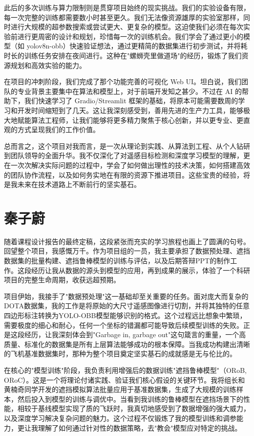 \documentclass[12pt, a4paper]{report}
\begin{document}
此后的多次训练与算力限制则是贯穿项目始终的现实挑战。我们的实验设备有限，每一次完整的训练都需要数小时甚至更久。我们无法像资源雄厚的实验室那样，同时进行大规模的超参数搜索或尝试更大、更复杂的模型。这迫使我们必须在每次实验前进行更周密的设计和规划，珍惜每一次的训练机会。我们学会了通过更小的模型（如 yolov8n-obb）快速验证想法，通过更精简的数据集进行初步测试，并将耗时长的训练任务安排在夜间进行。这种在"螺蛳壳里做道场"的经历，锻炼了我们资源规划和高效实验的能力。

在项目的冲刺阶段，我们完成了那个功能完善的可视化 Web UI。坦白说，我们团队的专业背景主要集中在算法和模型上，对于前端开发知之甚少。不过在 AI 的帮助下，我们快速学习了 Gradio/Streamlit 框架的基础，将原本可能需要数周的学习和开发时间缩短到了几天。这让我深刻感受到，善用先进的生产力工具，能够极大地赋能算法工程师，让我们能够将更多精力聚焦于核心创新，并以更专业、更直观的方式呈现我们的工作价值。

总而言之，这个项目对我而言，是一次从理论到实践、从算法到工程、从个人钻研到团队领导的全面升华。我不仅深化了对遥感目标检测和深度学习模型的理解，更在一次次解决实际问题的过程中，学会了如何做出理性的技术决策，如何搭建高效的团队协作流程，以及如何务实地在有限的资源下推进项目。这些宝贵的经验，将是我未来在技术道路上不断前行的坚实基石。

\vfill

\section{秦子蔚}
随着课程设计报告的最终定稿，这段紧张而充实的学习旅程也画上了圆满的句号。回望整个项目，我感慨万千。作为项目组的一员，我主要承担了数据预处理、遮挡数据集的批量构建、遮挡鲁棒模型的训练与评估，以及后期答辩PPT的制作工作。这段经历让我从数据的源头到模型的应用，再到成果的展示，体验了一个科研项目的完整生命周期，收获远超预期。

项目伊始，我接手了"数据预处理"这一基础却至关重要的任务。面对庞大而复杂的DOTA数据集，我的工作是将原始的大尺寸遥感图像进行切割，并将其独特的任意四边形标注转换为YOLO-OBB模型能够识别的格式。这个过程远比想象中繁琐，需要极度的细心和耐心，任何一个坐标的错漏都可能导致后续模型训练的失败。正是这段经历，让我深刻体会到"Garbage in, garbage out"这句箴言的重量，一个高质量、标准化的数据集是所有上层算法能够成功的根本保障。当我成功构建出清晰的飞机基准数据集时，那种为整个项目奠定坚实基石的成就感是无与伦比的。

在核心的"模型训练"阶段，我负责利用增强后的数据训练"遮挡鲁棒模型"（ORoB, ORoC）。这是一个将理论付诸实践、验证我们核心假设的关键环节。我将组长和黄楠奇同学开发的遮挡模拟算法批量应用于基准数据集，生成了大规模的训练样本，然后投入到模型的训练与调优中。当看到我训练的鲁棒模型在遮挡场景下的性能，相较于基线模型实现了质的飞跃时，我真切地感受到了数据增强的强大威力，以及深度学习解决复杂问题的魅力。这个过程不仅锻炼了我的模型训练和调参能力，更让我理解了如何通过针对性的数据策略，去"教会"模型应对特定的挑战。
\end{document}
